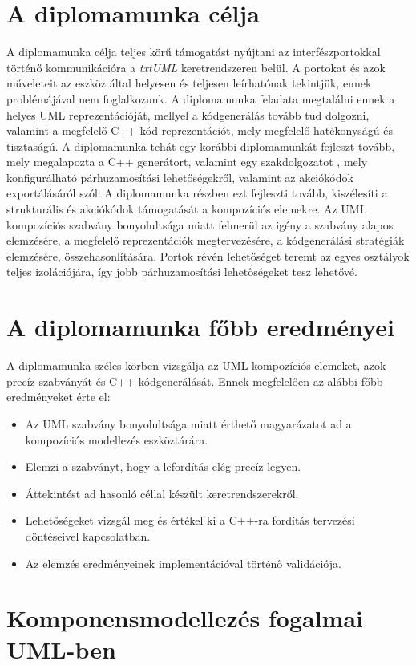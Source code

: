 \documentclass[a4paper,12pt]{report}
\begin{document}
\section{A diplomamunka célja}
A diplomamunka célja teljes körű támogatást nyújtani az interfészportokkal történő kommunikációra a \textit{txtUML} keretrendszeren belül. A portokat és azok műveleteit az eszköz által helyesen és teljesen leírhatónak tekintjük, ennek problémájával nem foglalkozunk. A diplomamunka feladata megtalálni ennek a helyes UML reprezentációját, mellyel a kódgenerálás tovább tud dolgozni, valamint a megfelelő C++ kód reprezentációt, mely megfelelő hatékonyságú és tisztaságú. A diplomamunka tehát egy korábbi diplomamunkát fejleszt tovább\cite{hack_dip}, mely megalapozta a C++ generátort, valamint egy szakdolgozatot \cite{my_szakdolg}, mely konfigurálható párhuzamosítási lehetőségekről, valamint az akciókódok exportálásáról szól. A diplomamunka részben ezt fejleszti tovább, kiszélesíti a strukturális és akciókódok támogatását a kompozíciós elemekre. Az UML kompozíciós szabvány bonyolultsága miatt felmerül az igény a szabvány alapos elemzésére, a megfelelő reprezentációk megtervezésére, a kódgenerálási stratégiák elemzésére, összehasonlítására. Portok révén lehetőséget teremt az egyes osztályok teljes izolációjára, így jobb párhuzamosítási lehetőségeket tesz lehetővé.

\section{A diplomamunka főbb eredményei}
A diplomamunka széles körben vizsgálja az UML kompozíciós elemeket, azok precíz szabványát és C++ kódgenerálását. Ennek megfelelően az alábbi főbb eredményeket érte el:
\begin{itemize}
\item Az UML szabvány bonyolultsága miatt érthető magyarázatot ad a kompozíciós modellezés eszköztárára.
\item Elemzi a szabványt, hogy a lefordítás elég precíz legyen.
\item Áttekintést ad hasonló céllal készült keretrendszerekről.
\item Lehetőségeket vizsgál meg és értékel ki a C++-ra fordítás tervezési döntéseivel kapcsolatban.
\item Az elemzés eredményeinek implementációval történő validációja.
\end{itemize}

\section{Komponensmodellezés fogalmai UML-ben}
\end{document}
